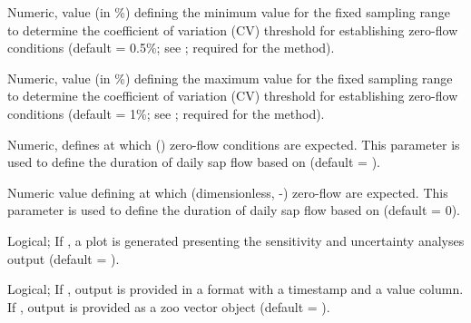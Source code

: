 \documentclass[a4paper]{book}
\begin{document}
\begin{Arguments}
\begin{ldescription}
\item[\code{criteria.cv\_min}] Numeric, value (in \%) defining the minimum value for the fixed sampling range to
determine the coefficient of variation (CV) threshold for establishing zero-flow conditions
(default = 0.5\%; see ; required for the   method).

\item[\code{criteria.cv\_max}] Numeric, value (in \%) defining the maximum value for the fixed sampling range
to determine the coefficient of variation (CV) threshold for establishing zero-flow conditions
(default = 1\%; see ; required for the   method).

\item[\code{min.sfd}] Numeric, defines at which  () zero-flow conditions are expected.
This parameter is used to define the duration of daily sap flow based on  (default = ).

\item[\code{min.k}] Numeric value defining at which  (dimensionless, -) zero-flow are expected.
This parameter is used to define the duration of daily sap flow based on  (default = 0).

\item[\code{make.plot}] Logical; If , a plot is generated presenting the sensitivity and uncertainty analyses output (default = ).

\item[\code{df}] Logical; If , output is provided in a  format with a timestamp and a value column.
If , output is provided as a zoo vector object (default = ).
\end{ldescription}
\end{Arguments}
%
\end{document}
